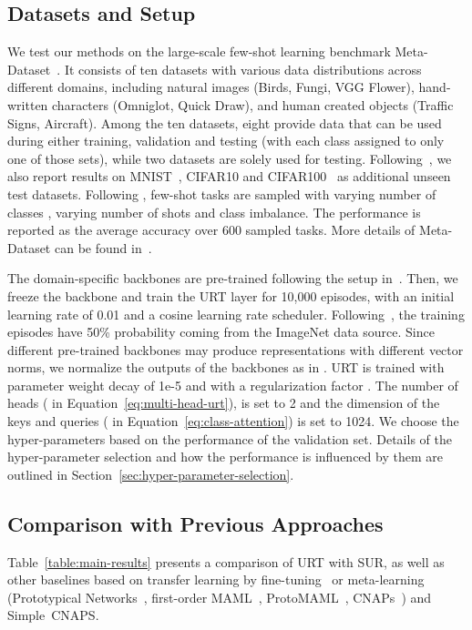 \documentclass{article}
\begin{document}
\subsection{Datasets and Setup}
We test our methods on the large-scale few-shot learning benchmark Meta-Dataset~\cite{triantafillou2019meta}. It consists of ten datasets with various data distributions across different domains, including natural images (Birds, Fungi, VGG Flower), hand-written characters (Omniglot, Quick Draw), and human created objects (Traffic Signs, Aircraft). Among the ten datasets, eight provide data that can be used during either training, validation and testing (with each class assigned to only one of those sets), while two datasets are solely used for testing. Following~\citet{bateni2020improved,requeima2019fast}, we also report results on MNIST~\cite{lecun1998gradient}, CIFAR10 and CIFAR100~\cite{krizhevsky2009learning} as additional unseen test datasets. Following \citet{triantafillou2019meta}, few-shot tasks are sampled with varying number of classes , varying number of shots  and class imbalance. 
The performance is reported as the average accuracy over 600 sampled tasks. More details of Meta-Dataset can be found in~\citet{triantafillou2019meta}.

The domain-specific backbones are pre-trained following the setup in~\cite{dvornik2020selecting}. Then, we freeze the backbone and train the URT layer for 10,000 episodes, with an initial learning rate of 0.01 and a cosine learning rate scheduler. 
Following~\citet{chen2020new}, the training episodes have 50\% probability coming from the ImageNet data source.
Since different pre-trained backbones may produce representations with different vector norms, we normalize the outputs of the backbones as in \citet{dvornik2020selecting}.
URT is trained with parameter weight decay of 1e-5 and with a regularization factor . The number of heads ( in Equation~\ref{eq:multi-head-urt}), is set to 2 and the dimension of the keys and queries ( in Equation~\ref{eq:class-attention}) is set to 1024.
We choose the hyper-parameters based on the performance of the validation set. Details of the hyper-parameter selection and how the performance is influenced by them are outlined in Section~\ref{sec:hyper-parameter-selection}.



\subsection{Comparison with Previous Approaches}
\label{ref:main-result}
Table~\ref{table:main-results} presents a comparison of URT with SUR, as well as other baselines based on transfer learning by fine-tuning~\cite{saikia2020optimized} or meta-learning (Prototypical Networks~\cite{snell2017prototypical}, first-order MAML~\cite{finn2017model}, ProtoMAML~\cite{triantafillou2019meta}, CNAPs~\cite{requeima2019fast}) and Simple~CNAPS\cite{bateni2020improved}.
\end{document}

